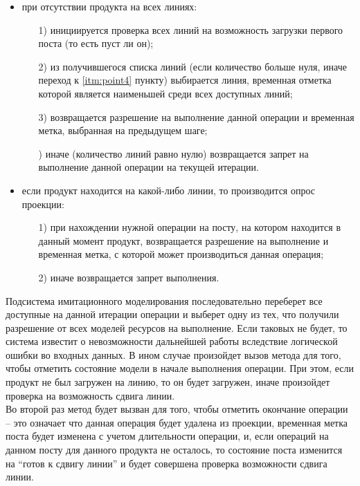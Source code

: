 \begin{itemize}
	\item при отсутствии продукта на всех линиях:
		\begin{enumerate}
			\item[1)] инициируется проверка всех линий на возможность загрузки первого поста (то есть пуст ли он);
			\item[2)] из получившегося списка линий (если количество больше нуля, иначе переход к \ref{itm:point4} пункту) выбирается линия, временная отметка которой является наименьшей среди всех доступных линий;
			\item[3)] возвращается разрешение на выполнение данной операции и временная метка, выбранная на предыдущем шаге;
			\item[\mylabel{itm:point4}{4})] иначе (количество линий равно нулю) возвращается запрет на выполнение данной операции на текущей итерации.
		\end{enumerate}
	\item если продукт находится на какой-либо линии, то производится опрос проекции:
		\begin{enumerate}
			\item[1)] при нахождении нужной операции на посту, на котором находится в данный момент продукт, возвращается разрешение на выполнение и временная метка, с которой может производиться данная операция;
			\item[2)] иначе возвращается запрет выполнения.
		\end{enumerate}
\end{itemize}

\indent Подсистема имитационного моделирования последовательно переберет все доступные на данной итерации операции и выберет одну из тех, что получили разрешение от всех моделей ресурсов на выполнение.
Если таковых не будет, то система известит о невозможности дальнейшей работы вследствие логической ошибки во входных данных.
В ином случае произойдет вызов метода для того, чтобы отметить состояние модели в начале выполнения операции.
При этом, если продукт не был загружен на линию, то он будет загружен, иначе произойдет проверка на возможность сдвига линии.\\
\indent Во второй раз метод будет вызван для того, чтобы отметить окончание операции -- это означает что данная операция будет удалена из проекции, временная метка поста будет изменена с учетом длительности операции, и, если операций на данном посту для данного продукта не осталось, то состояние поста изменится на ``готов к сдвигу линии'' и будет совершена проверка возможности сдвига линии.

